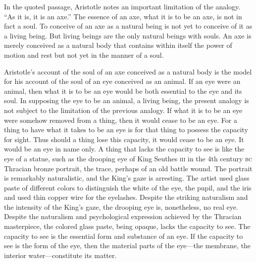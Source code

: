 In the quoted passage, Aristotle notes an important limitation of the analogy. ``As it is, it is an axe.'' The essence of an axe, what it is to be an axe, is not in fact a soul. To conceive of an axe as a natural being is not yet to conceive of it as a living being. But living beings are the only natural beings with souls. An axe is merely conceived as a natural body that contains within itself the power of motion and rest but not yet in the manner of a soul.

Aristotle's account of the soul of an axe conceived as a natural body is the model for his account of the soul of an eye conceived as an animal. If an eye were an animal, then what it is to be an eye would be both essential to the eye and its soul. In supposing the eye to be an animal, a living being, the present analogy is not subject to the limitation of the previous analogy. If what it is to be an eye were somehow removed from a thing, then it would cease to be an eye. For a thing to have what it takes to be an eye is for that thing to possess the capacity for sight. Thus should a thing lose this capacity, it would cease to be an eye. It would be an eye in name only. A thing that lacks the capacity to see is like the eye of a statue, such as the drooping eye of King Seuthes \textsc{iii} in the 4th century \textsc{bc} Thracian bronze portrait, the trace, perhaps of an old battle wound. The portrait is remarkably naturalistic, and the King's gaze is arresting. The artist used glass paste of different colors to distinguish the white of the eye, the pupil, and the iris and used thin copper wire for the eyelashes. Despite the striking naturalism and the intensity of the King's gaze, the drooping eye is, nonetheless, no real eye. Despite the naturalism and psychological expression achieved by the Thracian masterpiece, the colored glass paste, being opaque, lacks the capacity to see. The capacity to see is the essential form and substance of an eye. If the capacity to see is the form of the eye, then the material parts of the eye---the membrane, the interior water---constitute its matter.


